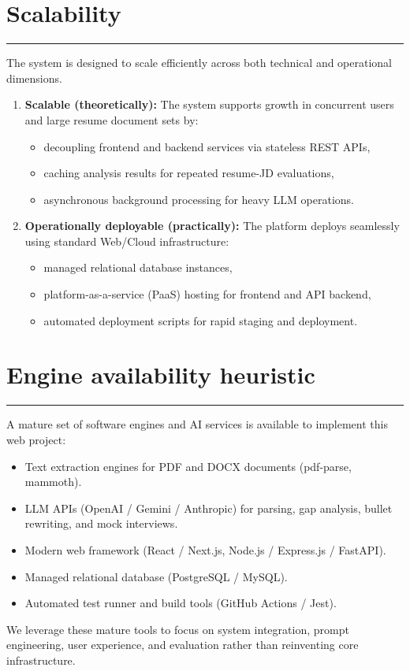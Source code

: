 \documentclass[11pt,a4paper]{article}
\newcommand{\BvrSectionRule}{%
  \par\nobreak\vspace{0.25em}%
  \noindent\rule{\linewidth}{0.4pt}%
  \par\nobreak\vspace{0.4em}%
}
\begin{document}
\section{Scalability %
}
\BvrSectionRule
The system is designed to scale efficiently across both
technical and operational dimensions.

\begin{enumerate}[leftmargin=0.7cm]
    \item \textbf{Scalable (theoretically):} The system supports growth in concurrent users and large resume document sets by:
    \begin{itemize}[leftmargin=0.7cm]
        \item decoupling frontend and backend services via stateless REST APIs,
        \item caching analysis results for repeated resume-JD evaluations,
        \item asynchronous background processing for heavy LLM operations.
    \end{itemize}

    \item \textbf{Operationally deployable (practically):} The platform deploys seamlessly using standard Web/Cloud infrastructure:
    \begin{itemize}[leftmargin=0.7cm]
        \item managed relational database instances,
        \item platform-as-a-service (PaaS) hosting for frontend and API backend,
        \item automated deployment scripts for rapid staging and deployment.
    \end{itemize}
\end{enumerate}

\section{Engine availability heuristic}
\BvrSectionRule
A mature set of software engines and AI services is
available to implement this web project:
\begin{itemize}[leftmargin=0.7cm]
    \item Text extraction engines for PDF and DOCX documents (pdf-parse, mammoth).
    \item LLM APIs (OpenAI / Gemini / Anthropic) for parsing, gap analysis, bullet rewriting, and mock interviews.
    \item Modern web framework (React / Next.js, Node.js / Express.js / FastAPI).
    \item Managed relational database (PostgreSQL / MySQL).
    \item Automated test runner and build tools (GitHub Actions / Jest).
\end{itemize}
We leverage these mature tools to focus on system integration,
prompt engineering, user experience, and evaluation rather
than reinventing core infrastructure.
\end{document}
